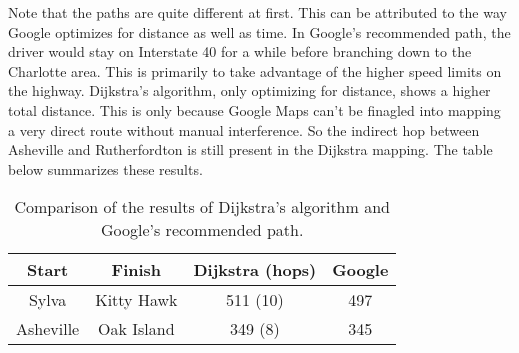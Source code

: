 \documentclass[]{../ncmathy}
\begin{document}
Note that the paths are quite different at first. This can be attributed to the way Google optimizes for distance as well as time. In Google's recommended path, the driver would stay on Interstate 40 for a while before branching down to the Charlotte area. This is primarily to take advantage of the higher speed limits on the highway. Dijkstra's algorithm, only optimizing for distance, shows a higher total distance. This is only because Google Maps can't be finagled into mapping a very direct route without manual interference. So the indirect hop between Asheville and Rutherfordton is still present in the Dijkstra mapping. The table below summarizes these results.

\begin{table}[H]
\centering\makegapedcells
\begin{tabular}{|| c c c c ||}
\hline
\textbf{Start} & \textbf{Finish} & \textbf{Dijkstra (hops)} & \textbf{Google} \\
\hline
Sylva & Kitty Hawk & 511 (10) & 497 \\
Asheville & Oak Island & 349 (8) & 345 \\
\hline
\end{tabular}
\caption{Comparison of the results of Dijkstra's algorithm and Google's recommended path.}
\end{table}
\end{document}
